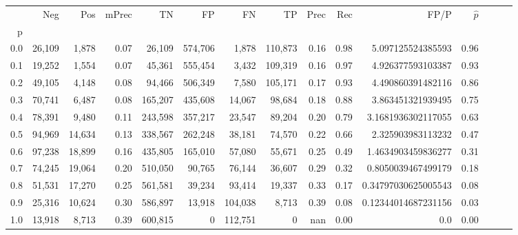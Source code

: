 \begin{tabular}{rrrrrrrrrrrrrrr}
\toprule
{} &     Neg &     Pos & mPrec &       TN &       FP &       FN &       TP &  Prec &   Rec &                 FP/P & $\hat{p}$ \\
p   &         &         &       &          &          &          &          &       &       &                      &           \\
\midrule
0.0 &  26,109 &   1,878 &  0.07 &   26,109 &  574,706 &    1,878 &  110,873 &  0.16 &  0.98 &    5.097125524385593 &      0.96 \\
0.1 &  19,252 &   1,554 &  0.07 &   45,361 &  555,454 &    3,432 &  109,319 &  0.16 &  0.97 &    4.926377593103387 &      0.93 \\
0.2 &  49,105 &   4,148 &  0.08 &   94,466 &  506,349 &    7,580 &  105,171 &  0.17 &  0.93 &    4.490860391482116 &      0.86 \\
0.3 &  70,741 &   6,487 &  0.08 &  165,207 &  435,608 &   14,067 &   98,684 &  0.18 &  0.88 &    3.863451321939495 &      0.75 \\
0.4 &  78,391 &   9,480 &  0.11 &  243,598 &  357,217 &   23,547 &   89,204 &  0.20 &  0.79 &   3.1681936302117055 &      0.63 \\
0.5 &  94,969 &  14,634 &  0.13 &  338,567 &  262,248 &   38,181 &   74,570 &  0.22 &  0.66 &    2.325903983113232 &      0.47 \\
0.6 &  97,238 &  18,899 &  0.16 &  435,805 &  165,010 &   57,080 &   55,671 &  0.25 &  0.49 &   1.4634903459836277 &      0.31 \\
0.7 &  74,245 &  19,064 &  0.20 &  510,050 &   90,765 &   76,144 &   36,607 &  0.29 &  0.32 &   0.8050039467499179 &      0.18 \\
0.8 &  51,531 &  17,270 &  0.25 &  561,581 &   39,234 &   93,414 &   19,337 &  0.33 &  0.17 &  0.34797030625005543 &      0.08 \\
0.9 &  25,316 &  10,624 &  0.30 &  586,897 &   13,918 &  104,038 &    8,713 &  0.39 &  0.08 &  0.12344014687231156 &      0.03 \\
1.0 &  13,918 &   8,713 &  0.39 &  600,815 &        0 &  112,751 &        0 &   nan &  0.00 &                  0.0 &      0.00 \\
\bottomrule
\end{tabular}
